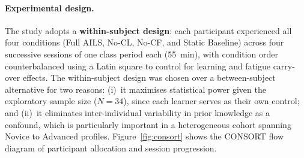 \documentclass[ASNA,twocolumn]{USG} %
\begin{document}
\paragraph{Experimental design.}
The study adopts a \textbf{within-subject design}: each participant
experienced all four conditions (Full AILS, No-CL, No-CF, and Static
Baseline) across four successive sessions of one class period each
(55~min), with condition order counterbalanced using a Latin square
to control for learning and fatigue carry-over effects.
The within-subject design was chosen over a between-subject
alternative for two reasons: (i)~it maximises statistical power
given the exploratory sample size ($N{=}34$), since each learner
serves as their own control; and (ii)~it eliminates inter-individual
variability in prior knowledge as a confound, which is particularly
important in a heterogeneous cohort spanning Novice to Advanced
profiles.
Figure~\ref{fig:consort} shows the CONSORT flow diagram of participant
allocation and session progression.
\end{document}
